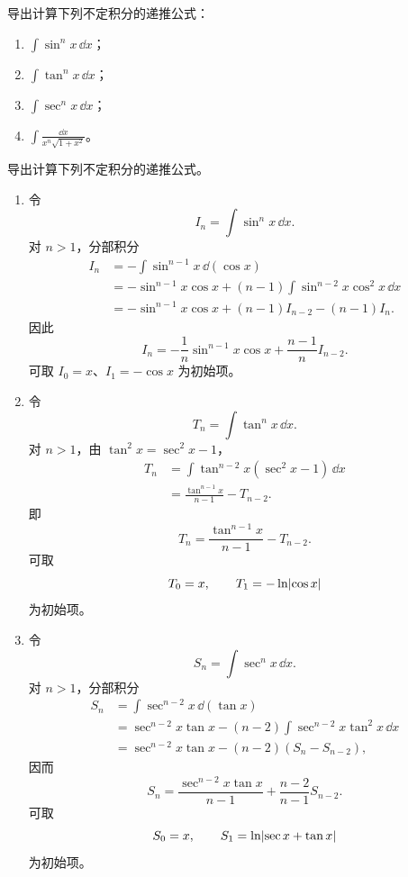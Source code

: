 \begin{xexercise}[4]
导出计算下列不定积分的递推公式：
  \begin{enumerate}[label=(\arabic*)]
    \item $\displaystyle\int\sin^nx\,\dd x$；
    \item $\displaystyle\int\tan^nx\,\dd x$；
    \item $\displaystyle\int\sec^nx\,\dd x$；
    \item $\displaystyle\int\frac{\dd x}{x^n\sqrt{1+x^2}}$。
  \end{enumerate}
\end{xexercise}
\begin{xsolution}
导出计算下列不定积分的递推公式。
  \begin{enumerate}[label=(\arabic*)]
    \item 令
    \[
      I_n=\int\sin^nx\,\dd x.
    \]
    对 $n>1$，分部积分
    \begin{align*}
      I_n
      &=-\int\sin^{n-1}x\,\dd(\cos x)\\
      &=-\sin^{n-1}x\cos x
        +(n-1)\int\sin^{n-2}x\cos^2x\,\dd x\\
      &=-\sin^{n-1}x\cos x+(n-1)I_{n-2}-(n-1)I_n.
    \end{align*}
    因此
    \[
      \boxed{I_n=-\frac1n\sin^{n-1}x\cos x+\frac{n-1}{n}I_{n-2}}.
    \]
    可取 $I_0=x$、$I_1=-\cos x$ 为初始项。

    \item 令
    \[
      T_n=\int\tan^nx\,\dd x.
    \]
    对 $n>1$，由 $\tan^2x=\sec^2x-1$，
    \begin{align*}
      T_n
      &=\int\tan^{n-2}x(\sec^2x-1)\,\dd x\\
      &=\frac{\tan^{n-1}x}{n-1}-T_{n-2}.
    \end{align*}
    即
    \[
      \boxed{T_n=\frac{\tan^{n-1}x}{n-1}-T_{n-2}}.
    \]
    可取
    \[
      T_0=x,
      \qquad
      T_1=-\ln\lvert\cos x\rvert
    \]
    为初始项。

    \item 令
    \[
      S_n=\int\sec^nx\,\dd x.
    \]
    对 $n>1$，分部积分
    \begin{align*}
      S_n
      &=\int\sec^{n-2}x\,\dd(\tan x)\\
      &=\sec^{n-2}x\tan x
        -(n-2)\int\sec^{n-2}x\tan^2x\,\dd x\\
      &=\sec^{n-2}x\tan x-(n-2)(S_n-S_{n-2}),
    \end{align*}
    因而
    \[
      \boxed{S_n=\frac{\sec^{n-2}x\tan x}{n-1}
      +\frac{n-2}{n-1}S_{n-2}}.
    \]
    可取
    \[
      S_0=x,
      \qquad
      S_1=\ln\lvert\sec x+\tan x\rvert
    \]
    为初始项。


\end{enumerate}
\end{xsolution}
